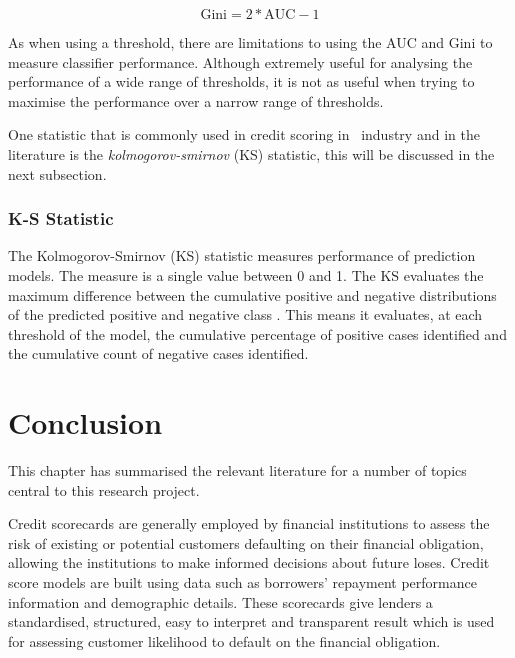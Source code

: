 \begin{equation} \label{eq:gini}
\text{Gini} = 2*\text{AUC} - 1
\end{equation}

As when using a threshold, there are limitations to using the AUC and Gini to measure classifier performance. Although extremely useful for analysing the performance of a wide range of thresholds, it is not as useful when trying to maximise the performance over a narrow range of thresholds. 

One statistic that is commonly used in credit scoring in \subjectname\, industry and in the literature is the \textit{kolmogorov-smirnov} (KS) statistic, this will be discussed in the next subsection.
	

\subsubsection{K-S Statistic}\label{subsub:ks}
The Kolmogorov-Smirnov (KS) statistic measures performance of prediction models. The measure is a single value between 0 and 1. The KS evaluates the maximum difference between the cumulative positive and negative distributions of the predicted positive and negative class \citep{seliya_study_2009}. This means it evaluates, at each threshold of the model, the cumulative percentage of positive cases identified and the cumulative count of negative cases identified.


\section{Conclusion}\label{sotaConc}
This chapter has summarised the relevant literature for a number of topics central to this research project.

Credit scorecards are generally employed by financial institutions to assess the risk of existing or potential customers defaulting on their financial obligation, allowing the institutions to make informed decisions about future loses. Credit score models are built using data such as borrowers' repayment performance information and demographic details. These scorecards give lenders a standardised, structured, easy to interpret and transparent result which is used for assessing customer likelihood to default on the financial obligation.

